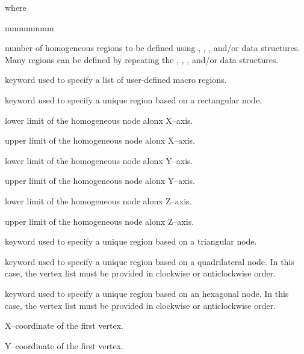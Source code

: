 \noindent where
\begin{ListeDeDescription}{mmmmmmm}

\item[\dusa{lp}] number of homogeneous regions to be defined using , , ,  and/or  data structures. Many regions can be defined by
repeating the , , ,  and/or  data structures.

\item[\moc{REGIONS}] keyword used to specify a list of  user-defined macro regions.

\item[\moc{RECT}] keyword used to specify a unique region based on a rectangular node. 

\item[\dusa{xm}] lower limit of the homogeneous node alonx X--axis.

\item[\dusa{xp}] upper limit of the homogeneous node alonx X--axis.

\item[\dusa{ym}] lower limit of the homogeneous node alonx Y--axis.

\item[\dusa{yp}] upper limit of the homogeneous node alonx Y--axis.

\item[\dusa{zm}] lower limit of the homogeneous node alonx Z--axis.

\item[\dusa{zp}] upper limit of the homogeneous node alonx Z--axis.

\item[\moc{TRIA}] keyword used to specify a unique region based on a triangular node.

\item[\moc{QUAD}] keyword used to specify a unique region based on a quadrilateral node. In this case, the vertex list must be provided in clockwise or anticlockwise order.

\item[\moc{HEXA}] keyword used to specify a unique region based on an hexagonal node. In this case, the vertex list must be provided in clockwise or anticlockwise order.

\item[\dusa{x1}] X--coordinate of the first vertex.

\item[\dusa{y1}] Y--coordinate of the first vertex.


\end{ListeDeDescription}
